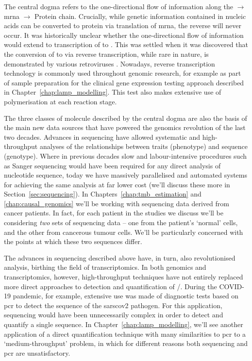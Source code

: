 \documentclass[thesis.tex]{subfiles}
\begin{document}
The central dogma refers to the one-directional flow of information along the  $\rightarrow$ \gls{mrna} $\rightarrow$ Protein chain. Crucially, while genetic information contained in nucleic acids can be converted to protein via translation of \gls{mrna}, the reverse will never occur. It was historically unclear whether the one-directional flow of information would extend to transcription of  to . This was settled when it was discovered that the conversion of   to   via reverse transcription, while rare in nature, is demonstrated by various retroviruses \citep{baltimore_rna-dependent_1970, temin_rna-dependent_1970, coffin_discovery_2016}. Nowadays, reverse transcription technology  is commonly used throughout genomic research, for example as part of sample preparation for the clinical gene expression testing approach described in Chapter~\ref{chap:lamp_modelling}. This test also makes extensive use of  polymerisation at each reaction stage.

The three classes of molecule described by the central dogma are also the basis of the main new data sources that have powered the genomics revolution of the last two decades. Advances in  sequencing have allowed systematic and high-throughput analyses of the relationships between traits (phenotype) and  sequence (genotype). Where in previous decades slow and labour-intensive procedures such as Sanger sequencing \citep{sanger_dna_1977} would have been required for any direct analysis of nucleotide sequence, today we have massively parallelised and automated systems for achieving the same analysis at far lower cost (we'll discuss these more in Section~\ref{sec:sequencing}). In Chapters~\ref{chap:tmb_estimation} and \ref{chap:causal_genomics} we'll be working with  sequencing data derived from cancer patients. In fact, for each patient in the studies we discuss we'll be considering \emph{two} sets of  sequencing data -- one from the patient's `normal' cells, and the other from cancerous tumour cells. We'll be particularly concerned with the points at which these two sequences differ.

The advances in sequencing described above have, in turn, also revolutionised  analysis, birthing the field of transcriptomics. In both genomics and transcriptomics, however, high-throughput techniques have not entirely replaced more direct approaches to detection and quantification of /. During the COVID-19 pandemic, for example, extensive use was made of diagnostic tests based on \gls{pcr} to detect the  sequence of the \gls{sarscov2} pathogen. For this application, sequencing would have been unnecessarily complex in order to detect and quantify a single  sequence. In Chapter~\ref{chap:lamp_modelling}, we'll see another application of a direct quantification technique with many similarities to \gls{pcr} to a `medium-throughput' problem, in which for different reasons both sequencing and \gls{pcr} are unsatisfactory.
\end{document}

